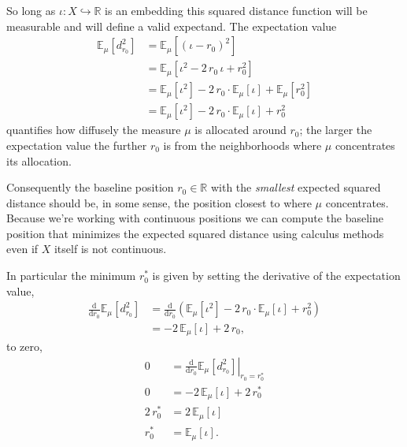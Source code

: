 \documentclass[
  letterpaper,
  DIV=11,
  numbers=noendperiod]{scrartcl}
\begin{document}
So long as \(\iota : X \hookrightarrow \mathbb{R}\) is an embedding this
squared distance function will be measurable and will define a valid
expectand. The expectation value \begin{align*}
\mathbb{E}_{\mu} \left[ d_{r_{0}}^{2} \right]
&=
\mathbb{E}_{\mu} \left[ (\iota - r_{0})^{2} \right]
\\
&=
\mathbb{E}_{\mu} \left[ \iota^{2} - 2 \, r_{0} \, \iota + r_{0}^{2} \right]
\\
&=
\mathbb{E}_{\mu} \left[ \iota^{2} \right]
-2 \, r_{0} \cdot \mathbb{E}_{\mu} \left[ \iota \right]
+ \mathbb{E}_{\mu} \left[ r_{0}^{2} \right]
\\
&=
\mathbb{E}_{\mu} \left[ \iota^{2} \right]
-2 \, r_{0} \cdot \mathbb{E}_{\mu} \left[ \iota \right]
+ r_{0}^{2}
\end{align*} quantifies how diffusely the measure \(\mu\) is allocated
around \(r_{0}\); the larger the expectation value the further \(r_{0}\)
is from the neighborhoods where \(\mu\) concentrates its allocation.

Consequently the baseline position \(r_{0} \in \mathbb{R}\) with the
\emph{smallest} expected squared distance should be, in some sense, the
position closest to where \(\mu\) concentrates. Because we're working
with continuous positions we can compute the baseline position that
minimizes the expected squared distance using calculus methods even if
\(X\) itself is not continuous.

In particular the minimum \(r_{0}^{*}\) is given by setting the
derivative of the expectation value, \begin{align*}
\frac{\mathrm{d}}{\mathrm{d} r_{0} }
\mathbb{E}_{\mu} \left[ d_{r_{0}}^{2} \right]
&=
\frac{\mathrm{d}}{\mathrm{d} r_{0} }
\left( \mathbb{E}_{\mu} \left[ \iota^{2} \right]
-2 \, r_{0} \cdot \mathbb{E}_{\mu} \left[ \iota \right]
+ r_{0}^{2} \right)
\\
&=
-2 \, \mathbb{E}_{\mu} \left[ \iota \right]
+ 2 \, r_{0},
\end{align*} to zero, \begin{align*}
0
&= \left. \frac{\mathrm{d}}{\mathrm{d} r_{0} }
\mathbb{E}_{\mu} \left[ d_{r_{0}}^{2} \right] \right|_{r_{0} = r_{0}^{*}}
\\
0
&=
-2 \, \mathbb{E}_{\mu} \left[ \iota \right]
+ 2 \, r_{0}^{*}
\\
2 \, r_{0}^{*}
&=
2 \, \mathbb{E}_{\mu} \left[ \iota \right]
\\
r_{0}^{*}
&=
\mathbb{E}_{\mu} \left[ \iota \right].
\end{align*}
\end{document}
